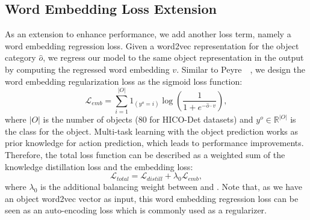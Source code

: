 \subsection{Word Embedding Loss Extension}
\label{sec.language}
As an extension to enhance performance, we add another loss term, namely a word embedding regression loss.
Given a word2vec representation for the object category ${\hat{o}}$, we regress our model to the same object representation in the output by computing the regressed word embedding $v$. 
Similar to Peyre~\etal~\cite{peyre2019detecting}, we design the word embedding regularization loss as the sigmoid loss function:
\begin{equation}
    \mathcal{L}_{emb}=\sum^{|O|}_{i=1}{1}_{(y^o=i)}\log(\frac{1}{1+e^{-\hat{o}\cdot v}}),
    \label{eqn:emb_loss}
\end{equation}
where $|O|$ is the number of objects (80 for HICO-Det datasets) and $y^o\in\mathbb{R}^{|O|}$ is the class for the object.
Multi-task learning with the object prediction works as prior knowledge for action prediction, which leads to performance improvements.
Therefore, the total loss function can be described as a weighted sum of the knowledge distillation loss and the embedding loss:\begin{equation}
    \mathcal{L}_{total}=\mathcal{L}_{distill} + \lambda_0 \mathcal{L}_{emb},
    \label{eqn:total_loss}
\end{equation}
where $\lambda_0$ is the additional balancing weight between  and .
Note that, as we have an object word2vec vector as input, this word embedding regression loss can be seen as an auto-encoding loss which is commonly used as a regularizer.



















